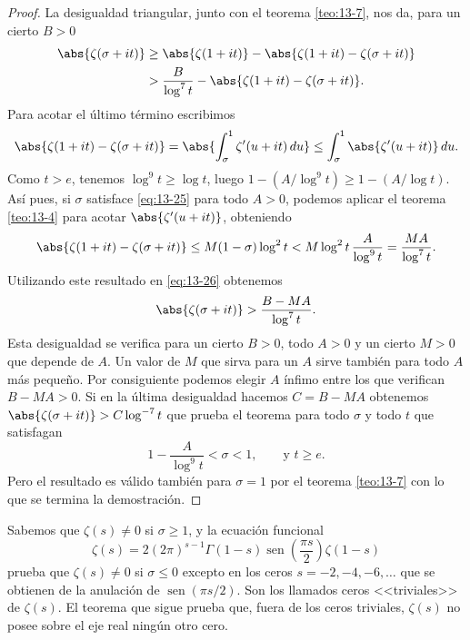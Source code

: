 \documentclass[12pt,a4paper]{book}
\begin{document}
    \begin{proof}
        La desigualdad triangular, junto con el teorema \ref{teo:13-7}, nos da, para un cierto
        $B>0$
        \begin{align}
            \abs{\zeta(\sigma+it)}&\geq\abs{\zeta(1+it)}-\abs{\zeta(1+it)-\zeta(\sigma+it)}\notag\\
            &>\frac{B}{\log^{7}t}-\abs{\zeta(1+it)-\zeta(\sigma+it)}.\label{eq:13-26}
        \end{align}
        Para acotar el último término escribimos
        \begin{equation*}
            \abs{\zeta(1+it)-\zeta(\sigma+it)}=\abs{\int_{\sigma}^{1}\zeta'(u+it)\,du}\leq\int_{\sigma}^{1}\abs{\zeta'(u+it)}\,du.
        \end{equation*}
        Como $t>e$, tenemos $\log^{9}t\geq\log t$, luego $1-(A/\log^{9}t)\geq1-(A/\log t)$. Así
        pues, si $\sigma$ satisface \eqref{eq:13-25} para todo $A>0$, podemos aplicar el teorema
        \ref{teo:13-4} para acotar $\abs{\zeta'(u+it)}$, obteniendo
        \begin{equation*}
            \abs{\zeta(1+it)-\zeta(\sigma+it)}\leq M(1-\sigma)\log^{2}t<M\log^{2}t\,\frac{A}{\log^{9}t}=\frac{MA}{\log^{7}t}.
        \end{equation*}
        Utilizando este resultado en \eqref{eq:13-26} obtenemos
        \begin{equation*}
            \abs{\zeta(\sigma+it)}>\frac{B-MA}{\log^{7}t}.
        \end{equation*}
        Esta desigualdad se verifica para un cierto $B>0$, todo $A>0$ y un cierto $M>0$ que
        depende de $A$. Un valor de $M$ que sirva para un $A$ sirve también para todo $A$ más
        pequeño. Por consiguiente podemos elegir $A$ ínfimo entre los que verifican
        $B-MA>0$. Si en la última desigualdad hacemos $C=B-MA$ obtenemos
        $\abs{\zeta(\sigma+it)}>C\log^{-7}t$ que prueba el teorema para todo $\sigma$ y todo
        $t$ que satisfagan
        \begin{equation*}
            1-\frac{A}{\log^{9}t}<\sigma<1,\qquad\text{y }t\geq e.
        \end{equation*}
        Pero el resultado es válido también para $\sigma=1$ por el teorema \ref{teo:13-7} con
        lo que se termina la demostración.
    \end{proof}

    Sabemos que $\zeta(s)\neq0$ si $\sigma\geq1$, y la ecuación funcional
    \begin{equation*}
        \zeta(s)=2(2\pi)^{s-1}\Gamma(1-s)\operatorname{sen}\left(\frac{\pi s}{2}\right)\zeta(1-s)
    \end{equation*}
    prueba que $\zeta(s)\neq0$ si $\sigma\leq0$ excepto en los ceros $s=-2,-4,-6,\dots$ que se
    obtienen de la anulación de $\operatorname{sen}(\pi s/2)$. Son los llamados ceros
    <<triviales>> de $\zeta(s)$. El teorema que sigue prueba que, fuera de los ceros
    triviales, $\zeta(s)$ no posee sobre el eje real ningún otro cero.
\end{document}
